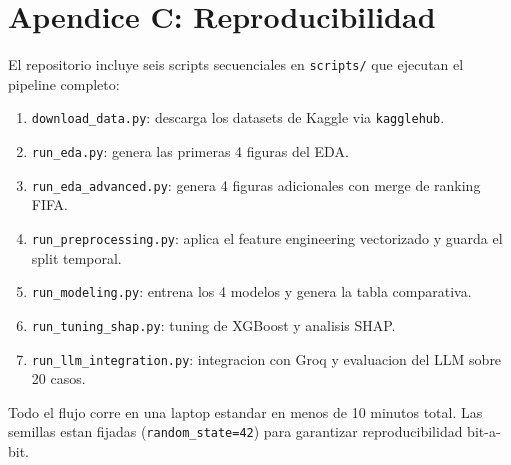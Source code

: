 \documentclass[10pt,twocolumn]{article}
\begin{document}
\section{Apendice C: Reproducibilidad}

El repositorio incluye seis scripts secuenciales en \texttt{scripts/} que ejecutan el pipeline completo:

\begin{enumerate}[leftmargin=*,topsep=2pt,itemsep=1pt]
  \item \texttt{download\_data.py}: descarga los datasets de Kaggle via \texttt{kagglehub}.
  \item \texttt{run\_eda.py}: genera las primeras 4 figuras del EDA.
  \item \texttt{run\_eda\_advanced.py}: genera 4 figuras adicionales con merge de ranking FIFA.
  \item \texttt{run\_preprocessing.py}: aplica el feature engineering vectorizado y guarda el split temporal.
  \item \texttt{run\_modeling.py}: entrena los 4 modelos y genera la tabla comparativa.
  \item \texttt{run\_tuning\_shap.py}: tuning de XGBoost y analisis SHAP.
  \item \texttt{run\_llm\_integration.py}: integracion con Groq y evaluacion del LLM sobre 20 casos.
\end{enumerate}

Todo el flujo corre en una laptop estandar en menos de 10 minutos total. Las semillas estan fijadas (\texttt{random\_state=42}) para garantizar reproducibilidad bit-a-bit.
\end{document}
